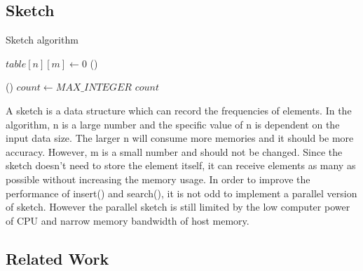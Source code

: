 \documentclass[conference]{IEEEtran}
\begin{document}
\subsection{Sketch}
\begin{algorithm}
\DontPrintSemicolon
\caption{Sketch algorithm}
$table[n][m] \longleftarrow 0$\;
\Fn()
{}
{
}

\Fn()
{}
{
    $count \leftarrow MAX\_INTEGER$\;
    \KwRet $count$\;
}
\end{algorithm}

A sketch is a data structure which can record the frequencies of elements. In the algorithm, n is a large number and the specific value of n is dependent on the input data size. The larger n will consume more memories and it should be more accuracy. However, m is a small number and should not be changed. 
Since the sketch doesn't need to store the element itself, it can receive elements as many as possible without increasing the memory usage.  
In order to improve the performance of insert() and search(), it is not odd to implement a parallel version of sketch. However the parallel sketch is still limited by the low computer power of CPU and narrow memory bandwidth of host memory. 

\subsection{Related Work}
\end{document}
